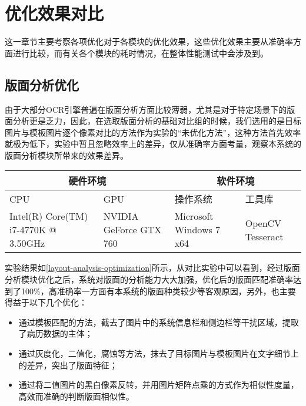\section{优化效果对比}
这一章节主要考察各项优化对于各模块的优化效果，这些优化效果主要从准确率方面进行比较，而有关各个模块的耗时情况，在整体性能测试中会涉及到。
\subsection{版面分析优化}
由于大部分OCR引擎普遍在版面分析方面比较薄弱，尤其是对于特定场景下的版面分析更是乏力，因此，在选取版面分析的基础对比组的时候，我们选用的是目标图片与模板图片逐个像素对比的方法作为实验的“未优化方法”，这种方法首先效率就极为低下，实验中暂且忽略效率上的差异，仅从准确率方面考量，观察本系统的版面分析模块所带来的效果差异。
\begin{table}[!htbp]
	\label{layout-analysis-optimization}
	\centering
	\vspace{10pt}
  \renewcommand\arraystretch{1.5}  %
	\begin{tabular}{p{3cm}|p{3cm}|p{3cm}|p{3cm}}
    \hline
    \multicolumn{2}{c|}{硬件环境} & \multicolumn{2}{c}{软件环境} \\
		\hline
    CPU&GPU&操作系统&工具库 \\
		\hline
    Intel(R) Core(TM)  i7-4770K @ 3.50GHz & NVIDIA GeForce  GTX 760 & Microsoft  Windows 7 x64 & OpenCV  Tesseract \\
    \hline
	\end{tabular}
\end{table}

实验结果如\autoref{layout-analysis-optimization}所示，从对比实验中可以看到，经过版面分析模块优化之后，系统对版面的分析能力大大加强，优化后的版面匹配准确率达到了100\%，高准确率一方面有本系统的版面种类较少等客观原因，另外，也主要得益于以下几个优化：
\begin{itemize}
  \item 通过模板匹配的方法，截去了图片中的系统信息栏和侧边栏等干扰区域，提取了病历数据的主体；
  \item 通过灰度化，二值化，腐蚀等方法，抹去了目标图片与模板图片在文字细节上的差异，突出了版面特征；
  \item 通过将二值图片的黑白像素反转，并用图片矩阵点乘的方式作为相似性度量，高效而准确的判断版面相似性。
\end{itemize}

